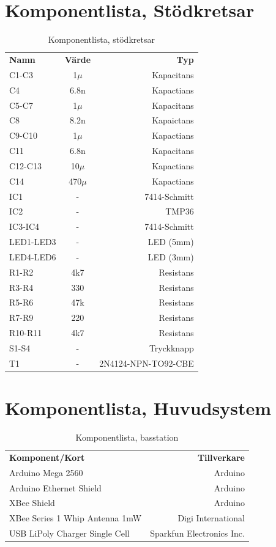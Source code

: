 \documentclass[a4paper,11pt]{article}
\begin{document}
\section{Komponentlista, Stödkretsar}

\begin{table}[h]
\centering
	\begin{tabular}{|l|c|r|}
	{\bf Namn} & {\bf Värde} & {\bf Typ} \\
	C1-C3			& 1$\mu$	& Kapacitans \\
	C4			& 6.8n		& Kapactians \\		
	C5-C7			& 1$\mu$	& Kapacitans \\
	C8			& 8.2n		& Kapaictans \\
	C9-C10			& 1$\mu$	& Kapactians \\
	C11			& 6.8n		& Kapacitans \\
	C12-C13			& 10$\mu$	& Kapactians \\
	C14			& 470$\mu$	& Kapactians \\
	IC1			& -		& 7414-Schmitt \\
	IC2			& -		& TMP36 \\
	IC3-IC4			& -		& 7414-Schmitt \\
	LED1-LED3		& -		& LED (5mm) \\
	LED4-LED6		& -		& LED (3mm) \\
	R1-R2			& 4k7		& Resistans \\
	R3-R4			& 330		& Resistans \\
	R5-R6			& 47k		& Resistans \\
	R7-R9			& 220		& Resistans \\
	R10-R11			& 4k7		& Resistans \\
	S1-S4			& -		& Tryckknapp \\
	T1                      & -		& 2N4124-NPN-TO92-CBE \\
	\end{tabular}
\caption{Komponentlista, stödkretsar}
\label{tab:komponenttable}
\end{table}
\pagebreak

\section{Komponentlista, Huvudsystem}

\begin{table}[h]
\centering
	\begin{tabular}{|l|r|}
	{\bf Komponent/Kort} & {\bf Tillverkare} \\
	Arduino Mega 2560                  & Arduino \\
	Arduino Ethernet Shield            & Arduino \\
	XBee Shield                        & Arduino \\
	XBee Series 1 Whip Antenna 1mW     & Digi International \\
	USB LiPoly Charger Single Cell     & Sparkfun Electronics Inc. \\
	\end{tabular}
\caption{Komponentlista, basstation}
\label{tab:korttable_bas}
\end{table}
\end{document}
